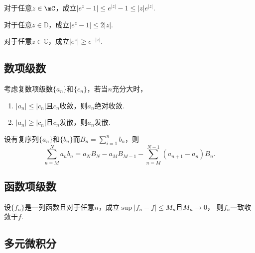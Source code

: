   \begin{pos}
    对于任意$z\in\mC$，成立$|e^z-1|\le e^{|z|}-1\le |z|e^{|z|}$.
  \end{pos}

  \begin{pos}
    对于任意$z\in\mathbb{D}$，成立$|e^z-1|\le 2|z|$.
  \end{pos}

  \begin{pos}
    对于任意$z\in\mathbb{C}$，成立$|e^z|\ge e^{-|z|}$.
  \end{pos}


\subsection{数项级数}

  \begin{thm}
    考虑复数项级数$\{a_n\}$和$\{c_n\}$，若当$n$充分大时，
    \begin{enumerate}
      \item $|a_n| \le |c_n|$且$c_n$收敛，则$a_n$绝对收敛.
      \item $|a_n| \ge |c_n|$且$c_n$发散，则$a_n$发散.
    \end{enumerate}
  \end{thm}

  \begin{thm}[分部求和]
    \label{thm: 分部求和}
    设有复序列$\{a_n\}$和$\{b_n\}$而$B_n=\sum_{i=1}^nb_n$，则
    \[
      \sum_{n=M}^N a_nb_n = a_NB_N - a_MB_{M-1} -
      \sum_{n=M}^{N-1}(a_{n+1}-a_n)B_n.
    \]
  \end{thm}

\subsection{函数项级数}

  \begin{thm}
    设$\{f_n\}$是一列函数且对于任意$n$，成立$\sup|f_n-f|\le M_n$且$M_n\to 0$，
    则$f_n$一致收敛于$f$.
  \end{thm}


\subsection{多元微积分}

